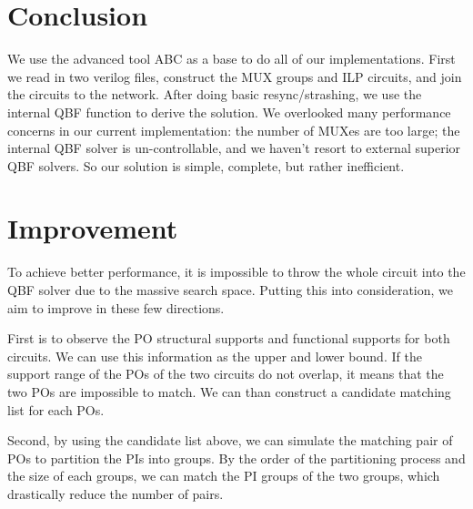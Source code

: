 \section{Conclusion}
We use the advanced tool ABC as a base to do all of our implementations. First we read in two verilog files, construct the MUX groups and ILP circuits, and join the circuits to the network. After doing basic resync/strashing, we use the internal QBF function to derive the solution.
We overlooked many performance concerns in our current implementation: the number of MUXes are too large; the internal QBF solver is un-controllable, and we haven't resort to external superior QBF solvers.
So our solution is simple, complete, but rather inefficient.

\section{Improvement}
To achieve better performance, it is impossible to throw the whole circuit into the QBF solver due to the massive search space. Putting this into consideration, we aim to improve in these few directions.

First is to observe the PO structural supports and functional supports for both circuits. We can use this information as the upper and lower bound. If the support range of the POs of the two circuits do not overlap, it means that the two POs are impossible to match. We can than construct a candidate matching list for each POs.

Second, by using the candidate list above, we can simulate the matching pair of POs to partition the PIs into groups. By the order of the partitioning process and the size of each groups, we can match the PI groups of the two groups, which drastically reduce the number of pairs.

